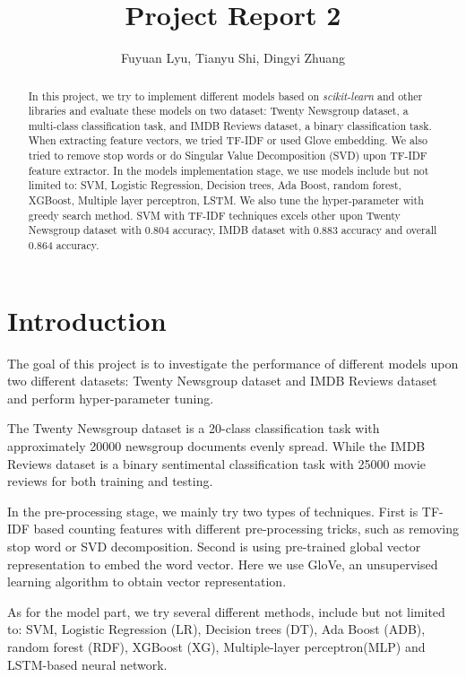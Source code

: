 \documentclass[11pt]{scrartcl}
\title{Project Report 2}
\author{Fuyuan Lyu, Tianyu Shi, Dingyi Zhuang}
\begin{document}
\maketitle

\begin{abstract}
In this project, we try to implement different models based on \textit{scikit-learn} and other libraries and evaluate these models on two dataset: Twenty Newsgroup dataset, a multi-class classification task, and IMDB Reviews dataset, a binary classification task. When extracting feature vectors, we tried TF-IDF or used Glove embedding. We also tried to remove stop words or do Singular Value Decomposition (SVD) upon TF-IDF feature extractor. In the models implementation stage, we use models include but not limited to: SVM, Logistic Regression, Decision trees, Ada Boost, random forest, XGBoost, Multiple layer perceptron, LSTM. We also tune the hyper-parameter with greedy search method. SVM with TF-IDF techniques excels other upon Twenty Newsgroup dataset with 0.804 accuracy, IMDB dataset with 0.883 accuracy and overall 0.864 accuracy.
\end{abstract}

\section{Introduction}
The goal of this project is to investigate the performance of different models upon two different datasets: Twenty Newsgroup dataset and IMDB Reviews dataset and perform hyper-parameter tuning.

The Twenty Newsgroup dataset is a 20-class classification task with approximately 20000 newsgroup documents evenly spread\cite{Lang95}. While the IMDB Reviews dataset is a binary sentimental classification task with 25000 movie reviews for both training and testing\cite{maas-EtAl:2011:ACL-HLT2011}.

In the pre-processing stage, we mainly try two types of techniques. First is TF-IDF based counting features with different pre-processing tricks, such as removing stop word or SVD decomposition. Second is using pre-trained global vector representation to embed the word vector. Here we use GloVe, an unsupervised learning algorithm to obtain vector representation\cite{pennington2014glove}.

As for the model part, we try several different methods, include but not limited to: SVM, Logistic Regression (LR), Decision trees (DT), Ada Boost (ADB), random forest (RDF), XGBoost (XG), Multiple-layer perceptron(MLP) and LSTM-based neural network.
\end{document}
